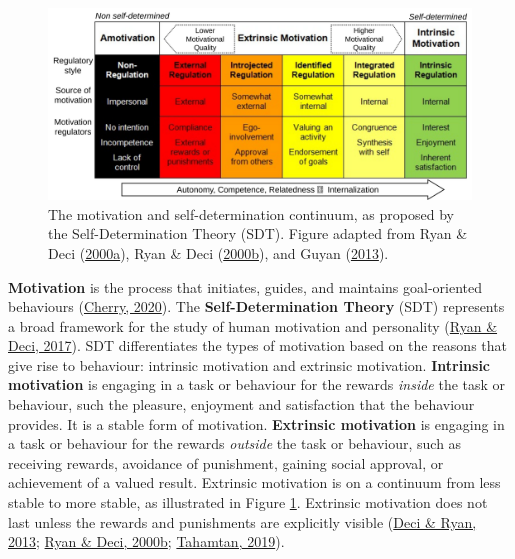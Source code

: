 \documentclass[letterpaper, nobind]{templates/ociamthesis}
\begin{document}
\begin{figure}

{\centering \includegraphics[width=1\linewidth]{figs/sdt-components} 

}

\caption[Motivation and self-determination continuum.]{The motivation and self-determination continuum, as proposed by the Self-Determination Theory (SDT). Figure adapted from Ryan \& Deci (\protect\hyperlink{ref-ryan2000intrinsic}{2000a}), Ryan \& Deci (\protect\hyperlink{ref-ryan2000self}{2000b}), and Guyan (\protect\hyperlink{ref-guyan2013improving}{2013}).}\label{fig:sdt-components}
\end{figure}





\textbf{Motivation} is the process that initiates, guides, and maintains
goal-oriented behaviours (\protect\hyperlink{ref-cherry2020what}{Cherry, 2020}). The \textbf{Self-Determination
Theory} (SDT) represents a broad framework for the study of human
motivation and personality (\protect\hyperlink{ref-ryan2017self}{Ryan \& Deci, 2017}). SDT differentiates the types
of motivation based on the reasons that give rise to behaviour:
intrinsic motivation and extrinsic motivation. \textbf{Intrinsic motivation}
is engaging in a task or behaviour for the rewards \emph{inside} the task or
behaviour, such the pleasure, enjoyment and satisfaction that the
behaviour provides. It is a stable form of motivation. \textbf{Extrinsic
motivation} is engaging in a task or behaviour for the rewards
\emph{outside} the task or behaviour, such as receiving rewards, avoidance of
punishment, gaining social approval, or achievement of a valued result.
Extrinsic motivation is on a continuum from less stable to more stable,
as illustrated in Figure \ref{fig:sdt-components}.
Extrinsic motivation does not last
unless the rewards and punishments are explicitly visible
(\protect\hyperlink{ref-deci2013intrinsic}{Deci \& Ryan, 2013}; \protect\hyperlink{ref-ryan2000self}{Ryan \& Deci, 2000b}; \protect\hyperlink{ref-tahamtan2019effect}{Tahamtan, 2019}).
\end{document}
